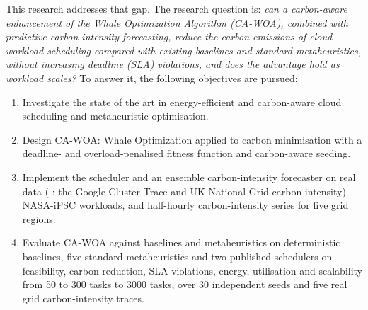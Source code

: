 \documentclass[12pt,a4paper]{article}
\providecommand{\DIFaddtex}[1]{{\protect\color{blue} \sf #1}} %
\providecommand{\DIFdeltex}[1]{{\protect\color{red} \scriptsize #1}} %
\providecommand{\DIFaddbegin}{} %
\providecommand{\DIFaddend}{} %
\providecommand{\DIFdelbegin}{} %
\providecommand{\DIFdelend}{} %
\providecommand{\DIFadd}[1]{\texorpdfstring{\DIFaddtex{#1}}{#1}} %
\providecommand{\DIFdel}[1]{\texorpdfstring{\DIFdeltex{#1}}{}} %
\providecommand{\DIFscaledelfig}{0.5}
\newlength{\DIFdelgraphicswidth} %
\newlength{\DIFdelgraphicsheight} %
\providecommand{\DIFaddincludegraphics}[2][]{{\color{blue}\fbox{\DIFOincludegraphics[#1]{#2}}}} %
\providecommand{\DIFdelincludegraphics}[2][]{%
\sbox{\DIFdelgraphicsbox}{\DIFOincludegraphics[#1]{#2}}%
\settoboxwidth{\DIFdelgraphicswidth}{\DIFdelgraphicsbox} %
\settoboxtotalheight{\DIFdelgraphicsheight}{\DIFdelgraphicsbox} %
\scalebox{\DIFscaledelfig}{%
\parbox[b]{\DIFdelgraphicswidth}{\usebox{\DIFdelgraphicsbox}\\[-\baselineskip] \rule{\DIFdelgraphicswidth}{0em}}\llap{\resizebox{\DIFdelgraphicswidth}{\DIFdelgraphicsheight}{%
\setlength{\unitlength}{\DIFdelgraphicswidth}%
\begin{picture}(1,1)%
\thicklines\linethickness{2pt} %
{\color[rgb]{1,0,0}\put(0,0){\framebox(1,1){}}}%
{\color[rgb]{1,0,0}\put(0,0){\line( 1,1){1}}}%
{\color[rgb]{1,0,0}\put(0,1){\line(1,-1){1}}}%
\end{picture}%
}\hspace*{3pt}}} %
} %
\DeclareRobustCommand{\DIFaddbegin}{\DIFOaddbegin \let\includegraphics\DIFaddincludegraphics} %
\DeclareRobustCommand{\DIFaddend}{\DIFOaddend \let\includegraphics\DIFOincludegraphics} %
\DeclareRobustCommand{\DIFdelbegin}{\DIFOdelbegin \let\includegraphics\DIFdelincludegraphics} %
\DeclareRobustCommand{\DIFdelend}{\DIFOaddend \let\includegraphics\DIFOincludegraphics} %
\begin{document}
This research addresses that gap. The research question is: \emph{can a carbon-aware enhancement of the Whale
Optimization Algorithm (CA-WOA), combined with predictive carbon-intensity forecasting, reduce the carbon
emissions of cloud workload scheduling compared with existing baselines and standard metaheuristics, without
increasing deadline (SLA) violations, and does the advantage hold as workload scales?} To answer it, the
following objectives are pursued:
\begin{enumerate}
\item Investigate the state of the art in energy-efficient and carbon-aware cloud scheduling and metaheuristic optimisation.
\item Design CA-WOA: Whale Optimization applied to carbon minimisation with a deadline- and overload-penalised fitness function and carbon-aware seeding.
\item Implement the scheduler and an ensemble carbon-intensity forecaster on real data\DIFdelbegin \DIFdel{(}\DIFdelend \DIFaddbegin \DIFadd{: the }\DIFaddend Google Cluster
Trace and \DIFdelbegin \DIFdel{UK National Grid carbon intensity)}\DIFdelend \DIFaddbegin \DIFadd{NASA-iPSC workloads, and half-hourly carbon-intensity series for five grid regions}\DIFaddend .
\item Evaluate CA-WOA against \DIFdelbegin \DIFdel{baselines and metaheuristics on }\DIFdelend \DIFaddbegin \DIFadd{deterministic baselines, five standard metaheuristics and two published
schedulers on feasibility, }\DIFaddend carbon reduction, SLA violations, energy, utilisation and scalability from \DIFdelbegin \DIFdel{50 to
300 tasks}\DIFdelend \DIFaddbegin \DIFadd{500 to
3000 tasks, over 30 independent seeds and five real grid carbon-intensity traces}\DIFaddend .
\end{enumerate}
\end{document}
